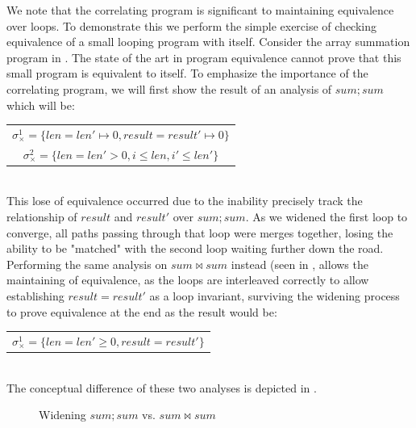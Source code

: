 We note that the correlating program is significant to maintaining equivalence over loops. To demonstrate this we perform the simple exercise of checking equivalence of a small looping program with itself. Consider the array summation program in . The state of the art in program equivalence cannot prove that this small program is equivalent to itself. To emphasize the importance of the correlating program, we will first show the result of an analysis of $sum;sum$ which will be:
\\
\begin{tabular}{c}
$\sigma_{\times}^1 = \{len = len' \mapsto 0, result = result' \mapsto 0\}$
\\
$\sigma_{\times}^2 = \{len = len' > 0, i \leq len, i' \leq len'\}$
\end{tabular}
\\

This lose of equivalence occurred due to the inability precisely track the relationship of $result$ and $result'$ over $sum;sum$. As we widened the first loop to converge, all paths passing through that loop were merges together, losing the ability to be "matched" with the second loop waiting further down the road. Performing the same analysis on $sum \bowtie sum$ instead (seen in , allows the maintaining of equivalence, as the loops are interleaved correctly to allow establishing $result = result'$ as a loop invariant, surviving the widening process to prove equivalence at the end as the result would be:
\\
\begin{tabular}{c}
$\sigma_{\times}^1 = \{len = len' \geq 0, result = result'\}$
\end{tabular}
\\
The conceptual difference of these two analyses is depicted in .
\begin{figure}
\caption{Widening $sum ; sum$ vs. $sum \bowtie sum$}
\end{figure}


